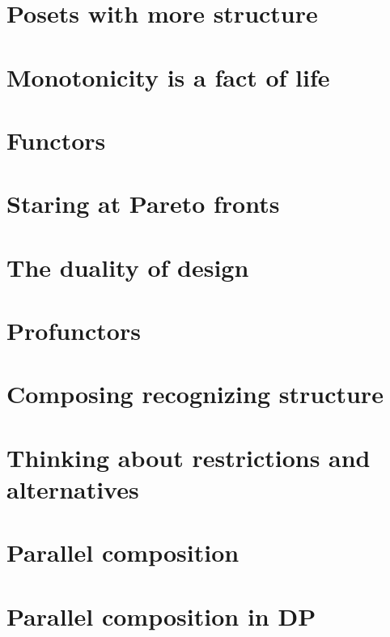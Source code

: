 \documentclass[paper=6in:9in,pagesize=pdftex,
 headinclude=off,footinclude=on,11pt,twoside]{scrbook}
\begin{document}
\chapter{Posets with more structure}

%
\chapter{Monotonicity is a fact of life}

\clearpage
%
\chapter{Functors}

\clearpage
%
\chapter{Staring at Pareto fronts}

\clearpage
%
\chapter{The duality of design}

\clearpage
%
\chapter{Profunctors}

\clearpage
%
\chapter{Composing recognizing structure}

\clearpage
%
\chapter{Thinking about restrictions and alternatives}

\clearpage
%
\chapter{Parallel composition}

\clearpage
%
\chapter{Parallel composition in DP}

\clearpage
%
\end{document}
